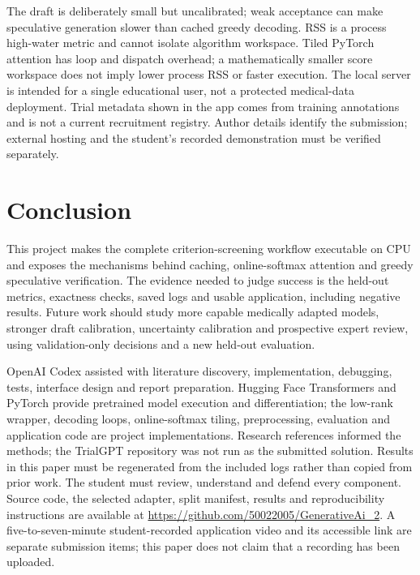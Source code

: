 \documentclass[conference]{IEEEtran}
\begin{document}
The draft is deliberately small but uncalibrated; weak acceptance can make speculative generation slower than cached greedy decoding. RSS is a process high-water metric and cannot isolate algorithm workspace. Tiled PyTorch attention has loop and dispatch overhead; a mathematically smaller score workspace does not imply lower process RSS or faster execution. The local server is intended for a single educational user, not a protected medical-data deployment. Trial metadata shown in the app comes from training annotations and is not a current recruitment registry. Author details identify the submission; external hosting and the student's recorded demonstration must be verified separately.

\section{Conclusion}
This project makes the complete criterion-screening workflow executable on CPU and exposes the mechanisms behind caching, online-softmax attention and greedy speculative verification. The evidence needed to judge success is the held-out metrics, exactness checks, saved logs and usable application, including negative results. Future work should study more capable medically adapted models, stronger draft calibration, uncertainty calibration and prospective expert review, using validation-only decisions and a new held-out evaluation.

OpenAI Codex assisted with literature discovery, implementation, debugging, tests, interface design and report preparation. Hugging Face Transformers and PyTorch provide pretrained model execution and differentiation; the low-rank wrapper, decoding loops, online-softmax tiling, preprocessing, evaluation and application code are project implementations. Research references informed the methods; the TrialGPT repository was not run as the submitted solution. Results in this paper must be regenerated from the included logs rather than copied from prior work. The student must review, understand and defend every component. Source code, the selected adapter, split manifest, results and reproducibility instructions are available at \url{https://github.com/50022005/GenerativeAi_2}. A five-to-seven-minute student-recorded application video and its accessible link are separate submission items; this paper does not claim that a recording has been uploaded.
\end{document}
